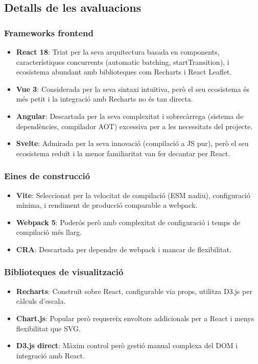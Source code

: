 \subsection{Detalls de les avaluacions}

\subsubsection{Frameworks frontend}
\begin{itemize}
    \item \textbf{React 18}: Triat per la seva arquitectura basada en components, característiques concurrents (automatic batching, startTransition), i ecosistema abundant amb biblioteques com Recharts i React Leaflet.
    \item \textbf{Vue 3}: Considerada per la seva sintaxi intuïtiva, però el seu ecosistema és més petit i la integració amb Recharts no és tan directa.
    \item \textbf{Angular}: Descartada per la seva complexitat i sobrecàrrega (sistema de dependències, compilador AOT) excessiva per a les necessitats del projecte.
    \item \textbf{Svelte}: Admirada per la seva innovació (compilació a JS pur), però el seu ecosistema reduït i la menor familiaritat van fer decantar per React.
\end{itemize}

\subsubsection{Eines de construcció}
\begin{itemize}
    \item \textbf{Vite}: Seleccionat per la velocitat de compilació (ESM nadiu), configuració mínima, i rendiment de producció comparable a webpack.
    \item \textbf{Webpack 5}: Poderós però amb complexitat de configuració i temps de compilació més llarg.
    \item \textbf{CRA}: Descartada per dependre de webpack i mancar de flexibilitat.
\end{itemize}

\subsubsection{Biblioteques de visualització}
\begin{itemize}
    \item \textbf{Recharts}: Construït sobre React, configurable via props, utilitza D3.js per càlculs d'escala.
    \item \textbf{Chart.js}: Popular però requereix envoltors addicionals per a React i menys flexibilitat que SVG.
    \item \textbf{D3.js direct}: Màxim control però gestió manual complexa del DOM i integració amb React.
\end{itemize}

